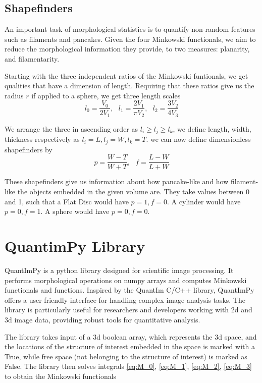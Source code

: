 \documentclass{article}
\begin{document}
\subsection{Shapefinders}
An important task of morphological statistics is to quantify non-random features such as filaments and pancakes. Given the four Minkowski functionals, we aim to reduce the morphological information they provide, to two measures: planarity, and filamentarity. \cite{Schmalzing1999}

Starting with the three independent ratios of the Minkowski funtionals, we get qualities that have a dimension of length. Requiring that these ratios give us the radius $r$ if applied to a sphere, we get three length scales
\begin{equation}
    l_0 = \frac {V_0}{2V_1}, \: \:\:
    l_1 = \frac {2 V_1}{\pi V_2}, \:\:\:
    l_2 = \frac {3 V_2}{4 V_3}
\end{equation}

We arrange the three in ascending order as $l_i \ge l_j \ge l_k$, we define length, width, thickness respectively as $l_i = L, l_j = W, l_k = T$.  we can now define dimensionless shapefinders by 
\begin{equation}
    p = \frac {W - T}{W + T}, \: \: \:
    f = \frac {L - W}{L + W}
\end{equation}

These shapefinders give us information about how pancake-like and how filament-like the objects embedded in the given volume are. They take values between 0 and 1, such that a Flat Disc would have $p = 1, f = 0$. A cylinder would have $p = 0, f = 1$. A sphere would have $p = 0, f = 0$. 

\section{QuantimPy Library}
QuantImPy is a python library designed for scientific image processing. It performs morphological operations on numpy arrays and computes Minkowski functionals and functions. Inspired by the QuantIm C/C++ library, QuantImPy offers a user-friendly interface for handling complex image analysis tasks. The library is particularly useful for researchers and developers working with 2d and 3d image data, providing robust tools for quantitative analysis. \cite{boelens2021quantimpy}

The library takes input of a 3d boolean array, which represents the 3d space, and the locations of the structure of interest embedded in the space is marked with a True, while free space (not belonging to the structure of interest) is marked as False. The library then solves integrals \ref{eq:M_0}, \ref{eq:M_1}, \ref{eq:M_2}, \ref{eq:M_3} to obtain the Minkowski functionals \cite{quantimpy_minkowski}
\end{document}
